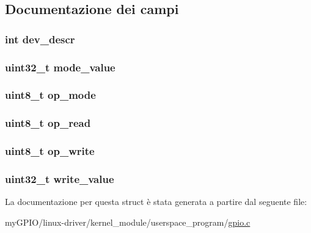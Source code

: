 \subsection{Documentazione dei campi}
\hypertarget{structparam__t_a52701f5f8091598d5c5ac1bb80cd2070}{
\subsubsection[{dev\+\_\+descr}]{\setlength{\rightskip}{0pt plus 5cm}int dev\+\_\+descr}}\label{structparam__t_a52701f5f8091598d5c5ac1bb80cd2070}
\hypertarget{structparam__t_a007b34e09ccda08824bc74ab9d86c5a8}{
\subsubsection[{mode\+\_\+value}]{\setlength{\rightskip}{0pt plus 5cm}uint32\+\_\+t mode\+\_\+value}}\label{structparam__t_a007b34e09ccda08824bc74ab9d86c5a8}
\hypertarget{structparam__t_aec948fb30e99b1eda7e3d9ff741d417a}{
\subsubsection[{op\+\_\+mode}]{\setlength{\rightskip}{0pt plus 5cm}uint8\+\_\+t op\+\_\+mode}}\label{structparam__t_aec948fb30e99b1eda7e3d9ff741d417a}
\hypertarget{structparam__t_ae66d5c3154a115636a63227b7489a6eb}{
\subsubsection[{op\+\_\+read}]{\setlength{\rightskip}{0pt plus 5cm}uint8\+\_\+t op\+\_\+read}}\label{structparam__t_ae66d5c3154a115636a63227b7489a6eb}
\hypertarget{structparam__t_a67752de733f167918a4e966354183a69}{
\subsubsection[{op\+\_\+write}]{\setlength{\rightskip}{0pt plus 5cm}uint8\+\_\+t op\+\_\+write}}\label{structparam__t_a67752de733f167918a4e966354183a69}
\hypertarget{structparam__t_a09e0cff25312ab7f748a3063c038a2d9}{
\subsubsection[{write\+\_\+value}]{\setlength{\rightskip}{0pt plus 5cm}uint32\+\_\+t write\+\_\+value}}\label{structparam__t_a09e0cff25312ab7f748a3063c038a2d9}


La documentazione per questa struct è stata generata a partire dal seguente file\+:\begin{DoxyCompactItemize}
\item 
my\+G\+P\+I\+O/linux-\/driver/kernel\+\_\+module/userspace\+\_\+program/\hyperlink{gpio_8c}{gpio.\+c}\end{DoxyCompactItemize}
